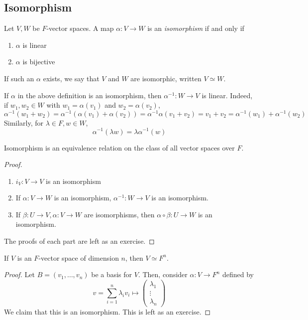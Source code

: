 \subsection{Isomorphism}
\begin{definition}
	Let \( V, W \) be \( F \)-vector spaces.
	A map \( \alpha \colon V \to W \) is an \textit{isomorphism} if and only if
	\begin{enumerate}
		\item \( \alpha \) is linear
		\item \( \alpha \) is bijective
	\end{enumerate}
	If such an \( \alpha \) exists, we say that \( V \) and \( W \) are isomorphic, written \( V \simeq W \).
\end{definition}
\begin{remark}
	If \( \alpha \) in the above definition is an isomorphism, then \( \alpha^{-1} \colon W \to V \) is linear.
	Indeed, if \( w_1, w_2 \in W \) with \( w_1 = \alpha(v_1) \) and \( w_2 = \alpha(v_2) \),
	\[
		\alpha^{-1} (w_1 + w_2) = \alpha^{-1} (\alpha(v_1) + \alpha(v_2)) = \alpha^{-1} \alpha (v_1 + v_2) = v_1 + v_2 = \alpha^{-1}(w_1) + \alpha^{-1}(w_2)
	\]
	Similarly, for \( \lambda \in F, w \in W \),
	\[
		\alpha^{-1}(\lambda w) = \lambda \alpha^{-1}(w)
	\]
\end{remark}
\begin{lemma}
	Isomorphism is an equivalence relation on the class of all vector spaces over \( F \).
\end{lemma}
\begin{proof}
	\begin{enumerate}
		\item \( i_V \colon V \to V \) is an isomorphism
		\item If \( \alpha \colon V \to W \) is an isomorphism, \( \alpha^{-1} \colon W \to V \) is an isomorphism.
		\item If \( \beta \colon U \to V, \alpha \colon V \to W \) are isomorphisms, then \( \alpha \circ \beta \colon U \to W \) is an isomorphism.
	\end{enumerate}
	The proofs of each part are left as an exercise.
\end{proof}
\begin{theorem}
	If \( V \) is an \( F \)-vector space of dimension \( n \), then \( V \simeq F^n \).
\end{theorem}
\begin{proof}
	Let \( B = (v_1, \dots, v_n) \) be a basis for \( V \).
	Then, consider \( \alpha \colon V \to F^n \) defined by
	\[
		v = \sum_{i=1}^n \lambda_i v_i \mapsto \begin{pmatrix}\lambda_1 \\ \vdots \\ \lambda_n \end{pmatrix}
	\]
	We claim that this is an isomorphism.
	This is left as an exercise.
\end{proof}

